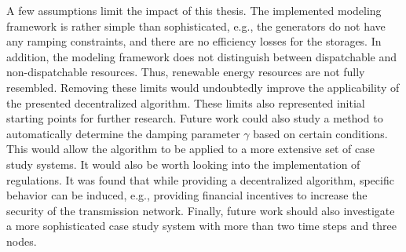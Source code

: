 A few assumptions limit the impact of this thesis. The implemented modeling framework is rather simple than sophisticated, e.g., the generators do not have any ramping constraints, and there are no efficiency losses for the storages. In addition, the modeling framework does not distinguish between dispatchable and non-dispatchable resources. Thus, renewable energy resources are not fully resembled. Removing these limits would undoubtedly improve the applicability of the presented decentralized algorithm. These limits also represented initial starting points for further research. Future work could also study a method to automatically determine the damping parameter $\gamma$ based on certain conditions. This would allow the algorithm to be applied to a more extensive set of case study systems. It would also be worth looking into the implementation of regulations. It was found that while providing a decentralized algorithm, specific behavior can be induced, e.g., providing financial incentives to increase the security of the transmission network. Finally, future work should also investigate a more sophisticated case study system with more than two time steps and three nodes.